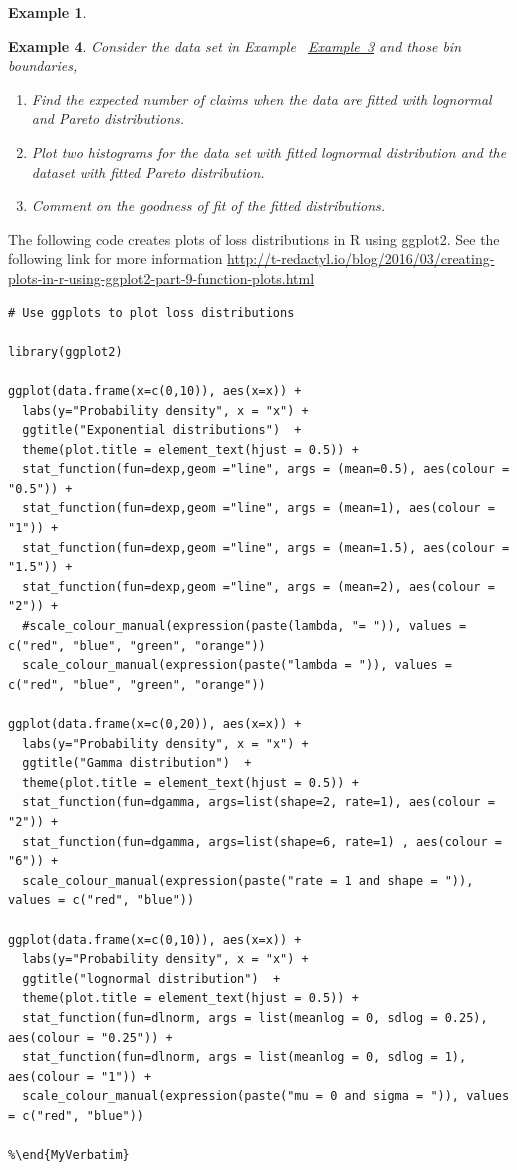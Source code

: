 \documentclass[
]{book}
\theoremstyle{definition}
\theoremstyle{definition}
\newtheorem{example}{Example}[chapter]
\theoremstyle{definition}
\theoremstyle{definition}
\theoremstyle{remark}
\begin{document}
\begin{example}
\protect\hypertarget{exm:unlabeled-div-30}{}\label{exm:unlabeled-div-30}

\textbf{Example 4}. \emph{Consider the data set in Example~
\protect\hyperlink{exampleFittingClaimSizes}{Example~3} and those bin boundaries,}

\begin{enumerate}
\def\labelenumi{\arabic{enumi}.}
\item
  \emph{Find the expected number of claims when the data are fitted with
  lognormal and Pareto distributions.}
\item
  \emph{Plot two histograms for the data set with fitted lognormal
  distribution and the dataset with fitted Pareto distribution.}
\item
  \emph{Comment on the goodness of fit of the fitted distributions.}
\end{enumerate}

\end{example}

The following code creates plots of loss distributions in R using
ggplot2. See the following link for more information
\url{http://t-redactyl.io/blog/2016/03/creating-plots-in-r-using-ggplot2-part-9-function-plots.html}

\begin{verbatim}
# Use ggplots to plot loss distributions

library(ggplot2)

ggplot(data.frame(x=c(0,10)), aes(x=x)) +
  labs(y="Probability density", x = "x") + 
  ggtitle("Exponential distributions")  +
  theme(plot.title = element_text(hjust = 0.5)) +
  stat_function(fun=dexp,geom ="line", args = (mean=0.5), aes(colour = "0.5")) +
  stat_function(fun=dexp,geom ="line", args = (mean=1), aes(colour = "1")) +
  stat_function(fun=dexp,geom ="line", args = (mean=1.5), aes(colour = "1.5")) +
  stat_function(fun=dexp,geom ="line", args = (mean=2), aes(colour = "2")) +
  #scale_colour_manual(expression(paste(lambda, "= ")), values = c("red", "blue", "green", "orange"))
  scale_colour_manual(expression(paste("lambda = ")), values = c("red", "blue", "green", "orange"))

ggplot(data.frame(x=c(0,20)), aes(x=x)) +
  labs(y="Probability density", x = "x") + 
  ggtitle("Gamma distribution")  +
  theme(plot.title = element_text(hjust = 0.5)) +
  stat_function(fun=dgamma, args=list(shape=2, rate=1), aes(colour = "2")) +
  stat_function(fun=dgamma, args=list(shape=6, rate=1) , aes(colour = "6")) +
  scale_colour_manual(expression(paste("rate = 1 and shape = ")), values = c("red", "blue"))

ggplot(data.frame(x=c(0,10)), aes(x=x)) +
  labs(y="Probability density", x = "x") + 
  ggtitle("lognormal distribution")  +
  theme(plot.title = element_text(hjust = 0.5)) +
  stat_function(fun=dlnorm, args = list(meanlog = 0, sdlog = 0.25), aes(colour = "0.25")) +
  stat_function(fun=dlnorm, args = list(meanlog = 0, sdlog = 1), aes(colour = "1")) +
  scale_colour_manual(expression(paste("mu = 0 and sigma = ")), values = c("red", "blue"))

%\end{MyVerbatim}
\end{verbatim}
\end{document}
